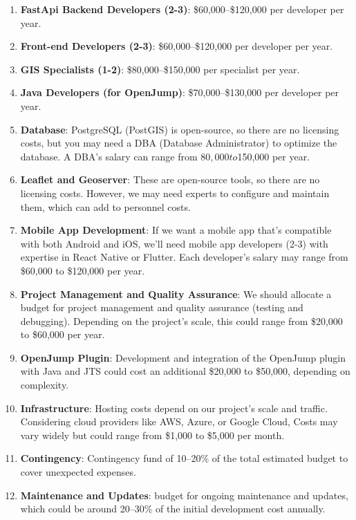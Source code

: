 \begin{enumerate}
    \item \textbf{FastApi Backend Developers (2-3)}: \$60,000--\$120,000 per developer per year.

    \item \textbf{Front-end Developers (2-3)}: \$60,000--\$120,000 per developer per year.

    \item \textbf{GIS Specialists (1-2)}: \$80,000--\$150,000 per specialist per year.

    \item \textbf{Java Developers (for OpenJump)}: \$70,000--\$130,000 per developer per year.

    \item \textbf{Database}: PostgreSQL (PostGIS) is open-source, so there are no licensing costs, but you may need a DBA (Database Administrator) to optimize the database. A DBA's salary can range from $80,000 to $150,000 per year.

    \item \textbf{Leaflet and Geoserver}: These are open-source tools, so there are no licensing costs.
    However, we may need experts to configure and maintain them, which can add to personnel costs.

    \item \textbf{Mobile App Development}: If we want a mobile app that's compatible with both Android and iOS, we'll need mobile app developers (2-3) with expertise in React Native or Flutter.
    Each developer's salary may range from \$60,000 to \$120,000 per year.

    \item \textbf{Project Management and Quality Assurance}: We should allocate a budget for project management and quality assurance (testing and debugging).
    Depending on the project's scale, this could range from \$20,000 to \$60,000 per year.

    \item \textbf{OpenJump Plugin}: Development and integration of the OpenJump plugin with Java and JTS could cost an additional \$20,000 to \$50,000, depending on complexity.

    \item \textbf{Infrastructure}: Hosting costs depend on our project's scale and traffic.
    Considering cloud providers like AWS, Azure, or Google Cloud, Costs may vary widely but could range from \$1,000 to \$5,000 per month.

    \item \textbf{Contingency}: Contingency fund of 10--20\% of the total estimated budget to cover unexpected expenses.

    \item \textbf{Maintenance and Updates}: budget for ongoing maintenance and updates, which could be around 20--30\% of the initial development cost annually.

\end{enumerate}


